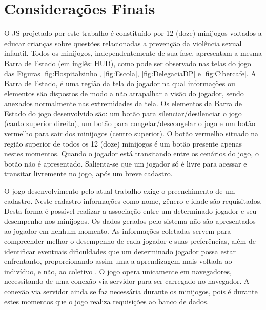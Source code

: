 
\section{Considerações Finais}\label{sec:fim}

O \acf{JS} projetado por este trabalho é constituído por 12 (doze) minijogos voltados a educar crianças sobre questões relacionadas a prevenção da violência sexual infantil. Todos os minijogos, independentemente de sua fase, apresentam a mesma Barra de Estado (em inglês: \acl{HUD}), como pode ser observado nas telas do jogo das Figuras \ref{fig:Hospitalzinho}, \ref{fig:Escola}, \ref{fig:DelegaciaDP} e \ref{fig:Cibercafe}. A Barra de Estado, é uma região da tela do jogador na qual informações ou elementos são dispostos de modo a não atrapalhar a visão do jogador, sendo anexados normalmente nas extremidades da tela. Os elementos da Barra de Estado do jogo desenvolvido são: um botão para silenciar/desilenciar o jogo (canto superior direito), um botão para congelar/descongelar o jogo e um botão vermelho para sair dos minijogos (centro superior). O botão vermelho situado na região superior de todos os 12 (doze) minijogos é um botão presente apenas nestes momentos. Quando o jogador está transitando entre os cenários do jogo, o botão não é apresentado. Salienta-se que um jogador só é livre para acessar e transitar livremente no jogo, após um breve cadastro. 

O jogo desenvolvimento pelo atual trabalho exige o preenchimento de um cadastro. Neste cadastro informações como nome, gênero e idade são requisitados. Desta forma é possível realizar a associação entre um determinado jogador e seu desempenho nos minijogos. Os dados gerados pelo sistema não são apresentados ao jogador em nenhum momento. As informações coletadas servem para compreender melhor o desempenho de cada jogador e suas preferências, além de identificar eventuais dificuldades que um determinado jogador possa estar enfrentanto, proporcionando assim uma a aprendizagem mais voltada ao indivíduo, e não, ao coletivo \cite{carrara2018criancca}. O jogo opera unicamente em navegadores, necessitando de uma conexão via servidor para ser carregado no navegador. A conexão via servidor ainda se faz necessária durante os minijogos, pois é durante estes momentos que o jogo realiza requisições ao banco de dados. 

